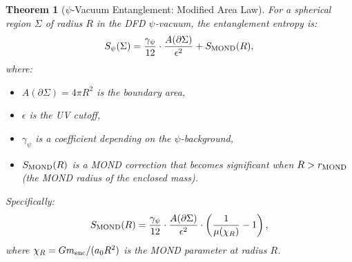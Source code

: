 \documentclass[11pt,a4paper]{article}
\newtheorem{theorem}{Theorem}
\begin{document}
\begin{theorem}[$\psi$-Vacuum Entanglement: Modified Area Law]
\label{thm:psi-entanglement}
For a spherical region $\Sigma$ of radius $R$ in the DFD $\psi$-vacuum, the entanglement entropy is:
\begin{equation}\label{eq:S-area}
S_\psi(\Sigma) = \frac{\gamma_\psi}{12}\cdot\frac{A(\partial\Sigma)}{\epsilon^2} + S_{\rm MOND}(R),
\end{equation}
where:
\begin{itemize}
\item $A(\partial\Sigma) = 4\pi R^2$ is the boundary area,
\item $\epsilon$ is the UV cutoff,
\item $\gamma_\psi$ is a coefficient depending on the $\psi$-background,
\item $S_{\rm MOND}(R)$ is a MOND correction that becomes significant when $R > r_{\rm MOND}$ (the MOND radius of the enclosed mass).
\end{itemize}

Specifically:
\begin{equation}
S_{\rm MOND}(R) = \frac{\gamma_\psi}{12}\cdot\frac{A(\partial\Sigma)}{\epsilon^2}\cdot\left(\frac{1}{\mu(\chi_R)} - 1\right),
\end{equation}
where $\chi_R = Gm_{\rm enc}/(a_0 R^2)$ is the MOND parameter at radius $R$.
\end{theorem}
\end{document}
